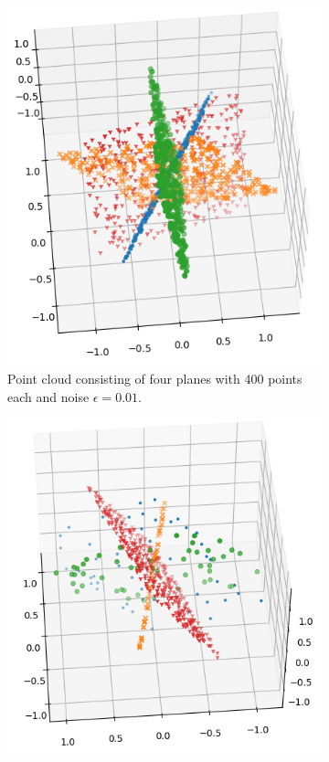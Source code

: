 \begin{figure}
    \centering
    \begin{subfigure}{.45\textwidth}
        \centering
        \includegraphics[width=\textwidth]{pics/points-400-400-400-400.png}
        \caption{Point cloud consisting of four planes with 400 points each and noise $\epsilon=0.01$.}
    \end{subfigure}%
    \hspace{2em}
    \begin{subfigure}{.45\textwidth}
        \centering
        \includegraphics[width=\textwidth]{pics/points-50-50-50-400.png}

\end{subfigure}
\end{figure}
